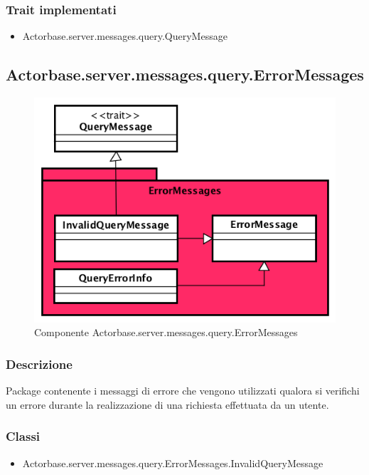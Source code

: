 \documentclass[a4paper]{article}
\begin{document}
			\subsubsection{Trait implementati}
				\begin{itemize}
					\item Actorbase.server.messages.query.QueryMessage
				\end{itemize}
		
				
		\subsection{Actorbase.server.messages.query.ErrorMessages}
		
			\begin{figure}[H]
				\centering
				\includegraphics[scale = 0.6]{ST/Server/errorMessagesLevel.png}
				\caption{Componente Actorbase.server.messages.query.ErrorMessages}
			\end{figure}
			
			\subsubsection{Descrizione}
				Package contenente i messaggi di errore che vengono utilizzati qualora si verifichi un errore durante la 
				realizzazione di una richiesta effettuata da un utente.
				
			\subsubsection{Classi}
				\begin{itemize}
					\item Actorbase.server.messages.query.ErrorMessages.InvalidQueryMessage
				\end{itemize}
				
\end{document}
